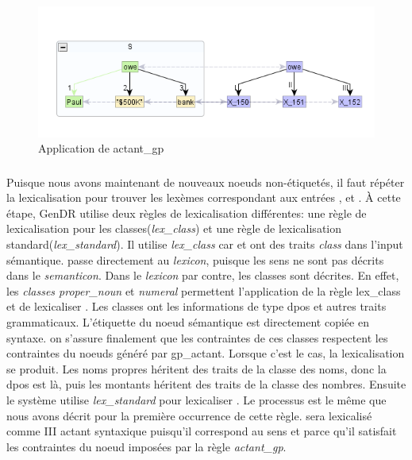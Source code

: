 \begin{figure}[htb]
	\centering
	\includegraphics[width=1\textwidth, trim = {0cm 8mm 0cm 15mm},clip]{ch3/figs/actant_gp1.png}
	\caption{Application de actant\_gp}
	\label{fig:actantgp}
\end{figure}

\subsubsection{}

Puisque nous avons maintenant de nouveaux noeuds non-étiquetés, il faut répéter la lexicalisation pour trouver les lexèmes correspondant aux entrées ,  et . À cette étape, GenDR utilise deux règles de lexicalisation différentes: une règle de lexicalisation pour les classes(\emph{lex\_class}) et une règle de lexicalisation standard(\emph{lex\_standard}). Il utilise \emph{lex\_class} car  et  ont des traits \emph{class} dans l'input sémantique.  passe directement au \emph{lexicon}, puisque les sens ne sont pas décrits dans le \emph{semanticon}. Dans le \emph{lexicon} par contre, les classes sont décrites. En effet, les \emph{classes proper\_noun} et \emph{numeral} permettent l'application de la règle lex\_class et de lexicaliser . Les classes ont les informations de type dpos et autres traits grammaticaux. L'étiquette du noeud sémantique est directement copiée en syntaxe. on s'assure finalement que les contraintes de ces classes respectent les contraintes du noeuds généré par gp\_actant. Lorsque c'est le cas, la lexicalisation se produit. Les noms propres héritent des traits de la classe des noms, donc la dpos est là, puis les montants héritent des traits de la classe des nombres. Ensuite le système utilise \emph{lex\_standard} pour lexicaliser . Le processus est le même que nous avons décrit pour la première occurrence de cette règle. sera lexicalisé comme III actant syntaxique puisqu'il correspond au sens  et parce qu'il satisfait les contraintes du noeud imposées par la règle \emph{actant\_gp}.

